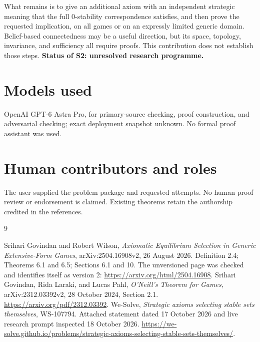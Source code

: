 \documentclass[11pt]{article}
\begin{document}
What remains is to give an additional axiom with an independent strategic meaning that the full $0$-stability correspondence satisfies, and then prove the requested implication, on all games or on an expressly limited generic domain. Belief-based connectedness may be a useful direction, but its space, topology, invariance, and sufficiency all require proofs. This contribution does not establish those steps. \textbf{Status of S2: unresolved research programme.}

\section*{Models used}
OpenAI GPT-6 Astra Pro, for primary-source checking, proof construction, and adversarial checking; exact deployment snapshot unknown. No formal proof assistant was used.
\section*{Human contributors and roles}
The user supplied the problem package and requested attempts. No human proof review or endorsement is claimed. Existing theorems retain the authorship credited in the references.

\begin{thebibliography}{9}
\raggedright
{} Srihari Govindan and Robert Wilson,
\emph{Axiomatic Equilibrium Selection in Generic Extensive-Form Games},
arXiv:2504.16908v2, 26 August 2026.
Definition 2.4; Theorems 6.1 and 6.5; Sections 6.1 and 10.
The unversioned page was checked and identifies itself as version 2:
\url{https://arxiv.org/html/2504.16908}.
 Srihari Govindan, Rida Laraki, and Lucas Pahl,
\emph{O'Neill's Theorem for Games}, arXiv:2312.03392v2,
28 October 2024, Section 2.1.
\url{https://arxiv.org/pdf/2312.03392}.
 We-Solve, \emph{Strategic axioms selecting stable sets themselves}, WS-107794.
Attached statement dated 17 October 2026 and live research prompt inspected
18 October 2026.
\url{https://we-solve.github.io/problems/strategic-axioms-selecting-stable-sets-themselves/}.
\end{thebibliography}
\end{document}
